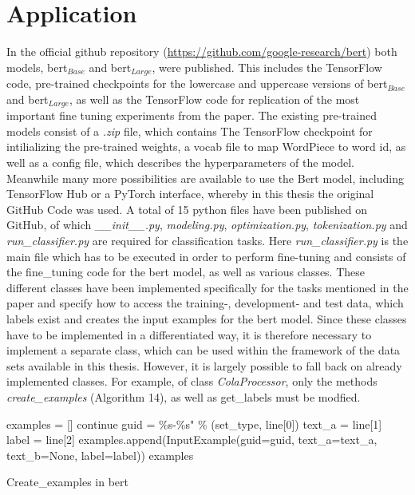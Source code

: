 \documentclass[a4paper, 11pt,titlepage,oneside,openany]{book}
\begin{document}
\section{Application}
In the official github repository (\url{https://github.com/google-research/bert}) both models, \gls{bert}$_{Base}$ and \gls{bert}$_{Large}$, were published. This includes the TensorFlow \cite{tensorflow} code, pre-trained checkpoints for the lowercase and uppercase versions of \gls{bert}$_{Base}$ and \gls{bert}$_{Large}$, as well as the TensorFlow code for replication of the most important fine tuning experiments from the paper. The existing pre-trained models consist of a \textit{.zip} file, which contains The TensorFlow checkpoint for intilializing the pre-trained weights, a vocab file to map WordPiece to word id, as well as a config file, which describes the hyperparameters of the model. Meanwhile many more possibilities are available to use the Bert model, including TensorFlow Hub or a PyTorch \cite{pytorch} interface, whereby in this thesis the original GitHub Code was used. 
A total of 15 python files have been published on GitHub, of which \textit{\_\_init\_\_.py}, \textit{modeling.py}, \textit{optimization.py}, \textit{tokenization.py} and \textit{run\_classifier.py} are required for classification tasks. Here \textit{run\_classifier.py} is the main file which has to be executed in order to perform fine-tuning and consists of the fine\_tuning code for the \gls{bert} model, as well as various classes. These different classes have been implemented specifically for the tasks mentioned in the paper and specify how to access the training-, development- and test data, which labels exist and creates the input examples for the \gls{bert} model. Since these classes have to be implemented in a differentiated way, it is therefore necessary to implement a separate class, which can be used within the framework of the data sets available in this thesis. However, it is largely possible to fall back on already implemented classes. For example, of class \textit{ColaProcessor}, only the methods \textit{ create\_examples} (Algorithm 14), as well as get\_labels must be modfied. 
\begin{algorithm}[t]
	\DontPrintSemicolon
	examples = []\;
	{
		{
			continue
		}
		guid = \%s-\%s" \% (set\_type, line[0])\;
		text\_a = line[1]\;
		label = line[2]\;
		examples.append(InputExample(guid=guid, text\_a=text\_a, text\_b=None, label=label))\;
	}
	\Return examples
	\caption{Create\_examples in \gls{bert}}
\end{algorithm} 
\end{document}
